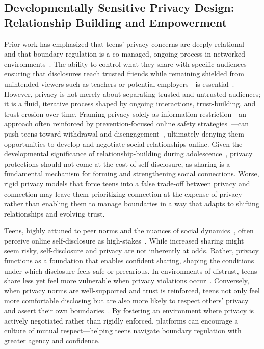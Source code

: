 \subsection{Developmentally Sensitive Privacy Design: Relationship Building and Empowerment}
Prior work has emphasized that teens' privacy concerns are deeply relational~\cite{zhao2022understanding} and that boundary regulation is a co-managed, ongoing process in networked environments~\cite{marwick2014networked}. The ability to control what they share with specific audiences---ensuring that disclosures reach trusted friends while remaining shielded from unintended viewers such as teachers or potential employers---is essential~\cite{Sleeper-2013-PostWasntFacebook-m, Stutzman-2012-BoundaryRegulationMedia-n}. However, privacy is not merely about separating trusted and untrusted audiences; it is a fluid, iterative process shaped by ongoing interactions, trust-building, and trust erosion over time. Framing privacy solely as information restriction---an approach often reinforced by prevention-focused online safety strategies~\cite{Wisniewski-2018-PrivacyParadox-l}---can push teens toward withdrawal and disengagement~\cite{kim2025privacysocialnormsystematically}, ultimately denying them opportunities to develop and negotiate social relationships online. Given the developmental significance of relationship-building during adolescence~\cite{Davis2012-bq}, privacy protections should not come at the cost of self-disclosure, as sharing is a fundamental mechanism for forming and strengthening social connections. Worse, rigid privacy models that force teens into a false trade-off between privacy and connection may leave them prioritizing connection at the expense of privacy rather than enabling them to manage boundaries in a way that adapts to shifting relationships and evolving trust.

Teens, highly attuned to peer norms and the nuances of social dynamics~\cite{Somerville2013-zf, Steinberg2005-qy}, often perceive online self-disclosure as high-stakes~\cite{Yau2019-ab}. While increased sharing might seem risky, self-disclosure and privacy are not inherently at odds. Rather, privacy functions as a foundation that enables confident sharing, shaping the conditions under which disclosure feels safe or precarious. In environments of distrust, teens share less yet feel more vulnerable when privacy violations occur~\cite{Petronio2002-ce, Williams2023-jm}. Conversely, when privacy norms are well-supported and trust is reinforced, teens not only feel more comfortable disclosing but are also more likely to respect others' privacy and assert their own boundaries~\cite{kim2025privacysocialnormsystematically, Waldman2018-dc, GhaiumyAnaraky-2021-DiscloseNotAdults-l}. By fostering an environment where privacy is actively negotiated rather than rigidly enforced, platforms can encourage a culture of mutual respect---helping teens navigate boundary regulation with greater agency and confidence.



